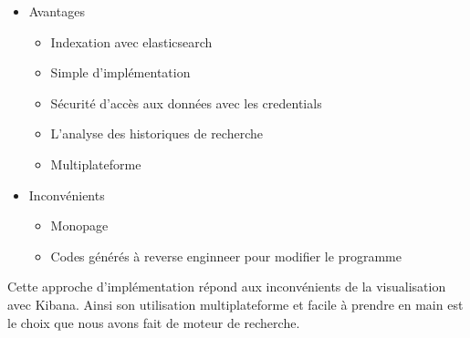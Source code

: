 \newpage
\begin{itemize}
    \item Avantages 
        \begin{itemize}
            \item Indexation avec elasticsearch
            \item Simple d’implémentation
            \item Sécurité d’accès aux données avec les credentials
            \item L’analyse des historiques de recherche
            \item Multiplateforme
        \end{itemize}
    \item Inconvénients 
        \begin{itemize}
        \item Monopage
        \item Codes générés à reverse enginneer pour modifier le programme
        \end{itemize}
\end{itemize}

Cette approche d’implémentation répond aux inconvénients de la visualisation avec Kibana. Ainsi son utilisation multiplateforme et facile à prendre en main est le choix que nous avons fait de moteur de recherche.  
